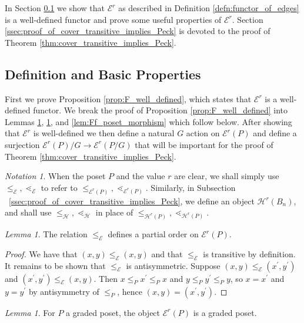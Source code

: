 \documentclass[10 pt]{amsart}
\theoremstyle{plain}
\theoremstyle{definition}
\theoremstyle{remark}
\numberwithin{equation}{section}
\newtheorem{lem}[thm]{Lemma}
\theoremstyle{remark}
\newtheorem{note}[thm]{Notation}
\newcommand\ssec{\subsection}
\begin{document}
In Section \ref{ssec:definition_and_basic_properties} we show that $\mathcal E^r$ as described in Definition \ref{defn:functor_of_edges} is a well-defined functor and prove some useful properties of $\mathcal E^r$.  Section \ref{ssec:proof_of_cover_transitive_implies_Peck} is devoted to the proof of Theorem \ref{thm:cover_transitive_implies_Peck}.

\ssec{Definition and Basic Properties}\label{ssec:definition_and_basic_properties}
First we prove Proposition \ref{prop:F_well_defined}, which states that $\mathcal E^r$ is a well-defined functor.  We break the proof of Proposition \ref{prop:F_well_defined} into Lemmas \ref{lem:f_partial_order}, \ref{lem:FP_graded_poset}, and \ref{lem:Ff_poset_morphism} which follow below.  After showing that $\mathcal E^r$ is well-defined we then define a natural $G$ action on $\mathcal E^r(P)$ and define a surjection $\mathcal E^r(P)/G\rightarrow \mathcal E^r(P/G)$ that will be important for the proof of Theorem \ref{thm:cover_transitive_implies_Peck}.

\begin{note}
When the poset $P$ and the value $r$ are clear, we shall simply use $\leq_{\mathcal E},\lessdot_{\mathcal E}$ to refer to $\leq_{\mathcal E^r(P)},\lessdot_{\mathcal E^r(P)}.$ Similarly, in Subsection ~\ref{ssec:proof_of_cover_transitive_implies_Peck}, we define an object $\mathcal H^r(B_n),$ and shall use $\leq_{\mathcal H},\lessdot_{\mathcal H}$ in place of $\leq_{\mathcal H^r(P)},\lessdot_{\mathcal H^r(P)}.$
\end{note}

\begin{lem}\label{lem:f_partial_order}
The relation $\le_{\mathcal E}$ defines a partial order on $\mathcal E^r(P)$.
\end{lem}

\begin{proof}
We have that $(x, y)\le_{\mathcal E} (x, y)$ and that $\le_{\mathcal E}$ is transitive by definition.  It remains to be shown that $\le_{\mathcal E}$ is antisymmetric.  Suppose $(x, y)\le_{\mathcal E} (x^\prime, y^\prime)$ and $(x^\prime, y^\prime)\le_{\mathcal E} (x, y)$.  Then $x\le_P x^\prime \le_P x$ and $y\le_P y^\prime \le_P y$, so $x = x^\prime$ and $y=y^\prime$ by antisymmetry of $\le_P$, hence $(x, y) = (x^\prime, y^\prime)$.
\end{proof}


\begin{lem}\label{lem:FP_graded_poset}
For $P$ a graded poset, the object $\mathcal E^r(P)$ is a graded poset.
\end{lem}
\end{document}
